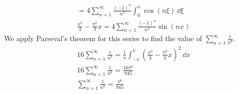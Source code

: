 {\begin{Solution}
\begin{enumerate}
\begin{gather*}
      = 4 \sum_{n=1}^\infty \frac{(-1)^n}{n^2} \int_0^x \cos(n \xi)\,\dd \xi
      \\
      \frac{x^3}{3} - \frac{\pi^2}{3} x = 4 \sum_{n=1}^\infty \frac{(-1)^n}{n^3} \sin(n x)
    \end{gather*}
    We apply Parseval's theorem for this series to find the value of
    $\sum_{n=1}^\infty \frac{1}{n^6}$.
    \begin{gather*}
      16 \sum_{n = 1}^\infty \frac{1}{n^6} 
      = \frac{1}{\pi} \int_{-\pi}^\pi \left( \frac{x^3}{3} - \frac{\pi^2}{3} x \right)^2 \,\dd x
      \\
      16 \sum_{n = 1}^\infty \frac{1}{n^6} = \frac{16 \pi^6}{945}
      \\
      \boxed{
        \sum_{n=1}^\infty \frac{1}{n^6} = \frac{\pi^6}{945}
        }
    \end{gather*}
  \end{enumerate}
\end{Solution}









}
